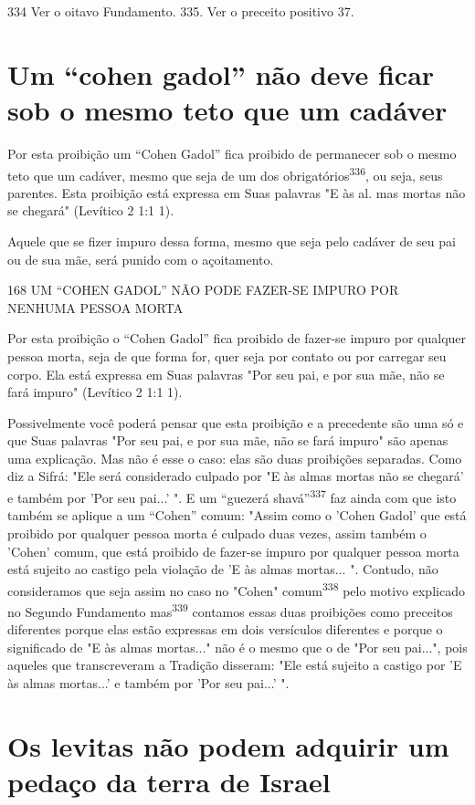 334 Ver o oitavo Fundamento. 335. Ver o preceito positivo 37.


\section{Um ``cohen gadol'' não deve ficar sob o mesmo teto que um cadáver}

Por esta proibição um ``Cohen Gadol'' fica proibido de permanecer sob o
mesmo teto que um cadáver, mesmo que seja de um dos
obrigatórios\textsuperscript{336}, ou seja, seus parentes. Esta
proibição está expressa em Suas palavras "E às al­. mas mortas não se
chegará" (Levítico 2 1:1 1).

Aquele que se fizer impuro dessa forma, mesmo que seja pelo cadá­ver de
seu pai ou de sua mãe, será punido com o açoitamento.

168 UM ``COHEN GADOL'' NÃO PODE FAZER-SE IMPURO POR NENHUMA PESSOA MORTA

Por esta proibição o ``Cohen Gadol'' fica proibido de fazer-se impu­ro por
qualquer pessoa morta, seja de que forma for, quer seja por contato ou
por carregar seu corpo. Ela está expressa em Suas palavras "Por seu pai,
e por sua mãe, não se fará impuro" (Levítico 2 1:1 1).

Possivelmente você poderá pensar que esta proibição e a preceden­te são
uma só e que Suas palavras "Por seu pai, e por sua mãe, não se fará
impu­ro" são apenas uma explicação. Mas não é esse o caso: elas são duas
proibições separadas. Como diz a Sifrá: "Ele será considerado culpado
por "E às almas mor­tas não se chegará' e também por 'Por seu pai...' ".
E um ``guezerá shavá''\textsuperscript{337} faz ainda com que isto também
se aplique a um ``Cohen'' comum: "Assim co­mo o 'Cohen Gadol' que está
proibido por qualquer pessoa morta é culpado duas vezes, assim também o
'Cohen' comum, que está proibido de fazer-se im­puro por qualquer pessoa
morta está sujeito ao castigo pela violação de 'E às almas mortas... ".
Contudo, não consideramos que seja assim no caso no "Co­hen"
comum\textsuperscript{338} pelo motivo explicado no Segundo Fundamento
mas\textsuperscript{339} con­tamos essas duas proibições como preceitos
diferentes porque elas estão ex­pressas em dois versículos diferentes e
porque o significado de "E às almas mor­tas..." não é o mesmo que o de
"Por seu pai...", pois aqueles que transcreve­ram a Tradição disseram:
"Ele está sujeito a castigo por 'E às almas mortas...' e também por 'Por
seu pai...' ".

\section{Os levitas não podem adquirir um pedaço da terra de Israel}

